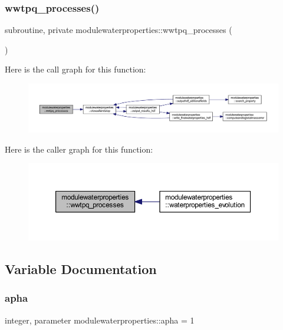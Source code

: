 \subsubsection{\texorpdfstring{wwtpq\+\_\+processes()}{wwtpq\_processes()}}
{\footnotesize\ttfamily subroutine, private modulewaterproperties\+::wwtpq\+\_\+processes (\begin{DoxyParamCaption}{ }\end{DoxyParamCaption})\hspace{0.3cm}{\ttfamily [private]}}

Here is the call graph for this function\+:\nopagebreak
\begin{figure}[H]
\begin{center}
\leavevmode
\includegraphics[width=350pt]{namespacemodulewaterproperties_ad35241441c35aaaf61a0529c6be215e9_cgraph}
\end{center}
\end{figure}
Here is the caller graph for this function\+:\nopagebreak
\begin{figure}[H]
\begin{center}
\leavevmode
\includegraphics[width=350pt]{namespacemodulewaterproperties_ad35241441c35aaaf61a0529c6be215e9_icgraph}
\end{center}
\end{figure}


\subsection{Variable Documentation}
\mbox{\label{namespacemodulewaterproperties_ad3d25ef03f7249eeb914147244f7ab21}} 
\subsubsection{\texorpdfstring{apha}{apha}}
{\footnotesize\ttfamily integer, parameter modulewaterproperties\+::apha = 1\hspace{0.3cm}{\ttfamily [private]}}

